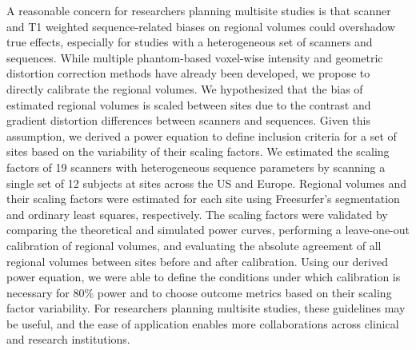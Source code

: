 
A reasonable concern for researchers planning multisite studies is that scanner and T1 weighted sequence-related biases on regional volumes could overshadow true effects, especially for studies with a heterogeneous set of scanners and sequences. While multiple phantom-based voxel-wise intensity and geometric distortion correction methods have already been developed, we propose to directly calibrate the regional volumes. We hypothesized that the bias of estimated regional volumes is scaled between sites due to the contrast and gradient distortion differences between scanners and sequences. Given this assumption, we derived a power equation to define inclusion criteria for a set of sites based on the variability of their scaling factors. We estimated the scaling factors of 19 scanners with heterogeneous sequence parameters by scanning a single set of 12 subjects at sites across the US and Europe. Regional volumes and their scaling factors were estimated for each site using Freesurfer's segmentation and ordinary least squares, respectively. The scaling factors were validated by comparing the theoretical and simulated power curves, performing a leave-one-out calibration of regional volumes, and evaluating the absolute agreement of all regional volumes between sites before and after calibration. Using our derived power equation, we were able to define the conditions under which calibration is necessary for 80\% power and to choose outcome metrics based on their scaling factor variability. For researchers planning multisite studies, these guidelines may be useful, and the ease of application enables more collaborations across clinical and research institutions.